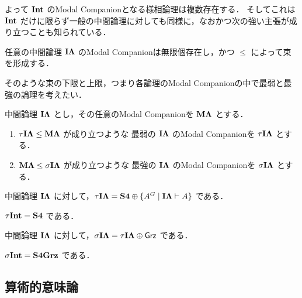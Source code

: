 \documentclass{jlreq}
\begin{document}
よって $\mathbf{Int}$ のModal Companionとなる様相論理は複数存在する．
そしてこれは $\mathbf{Int}$ だけに限らず一般の中間論理に対しても同様に，なおかつ次の強い主張が成り立つことも知られている．

\begin{theorem}
	任意の中間論理 $\mathbf{I\Lambda}$ のModal Companionは無限個存在し，かつ $\leq$ によって束を形成する．
\end{theorem}

そのような束の下限と上限，つまり各論理のModal Companionの中で最弱と最強の論理を考えたい．

\begin{definition}
	中間論理 $\mathbf{I\Lambda}$ とし，その任意のModal Companionを $\mathbf{M\Lambda}$ とする．

	\begin{enumerate}
		\item
		      $\tau\mathbf{I\Lambda} \leq \mathbf{M\Lambda}$ が成り立つような
		      最弱の $\mathbf{I\Lambda}$ のModal Companionを $\tau\mathbf{I\Lambda}$ とする．
		\item
		      $\mathbf{M\Lambda} \leq \sigma\mathbf{I\Lambda}$ が成り立つような
		      最強の $\mathbf{I\Lambda}$ のModal Companionを $\sigma\mathbf{I\Lambda}$ とする．
	\end{enumerate}
\end{definition}

\begin{theorem}
	中間論理 $\mathbf{I\Lambda}$ に対して，$\tau \mathbf{I\Lambda} = \mathbf{S4} \oplus \{ A^G \mid \mathbf{I\Lambda} \vdash A \} $ である．
\end{theorem}

\begin{corollary}
	$\tau \mathbf{Int} = \mathbf{S4}$ である．
\end{corollary}

\begin{theorem}
	中間論理 $\mathbf{I\Lambda}$ に対して，$\sigma \mathbf{I\Lambda} = \tau\mathbf{I\Lambda} \oplus \mathsf{Grz}$ である．
\end{theorem}

\begin{corollary}
	$\sigma \mathbf{Int} = \mathbf{S4Grz}$ である．
\end{corollary}


\subsection{算術的意味論}
\end{document}
